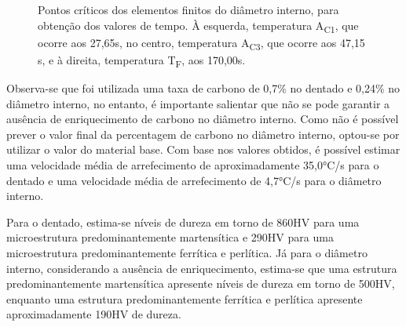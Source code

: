 \begin{figure}[htb]
\begin{subfigure}{.33\textwidth}
        \caption{}
        \label{fig:Tf_Dint}
    \end{subfigure}
    \caption[Pontos críticos dos elementos finitos do diâmetro interno]%
    {Pontos críticos dos elementos finitos do diâmetro interno, para obtenção dos valores de tempo. À esquerda, temperatura A\textsubscript{C1}, que ocorre aos 27,65s, no centro, temperatura A\textsubscript{C3}, que ocorre aos 47,15 s, e à direita, temperatura T\textsubscript{F}, aos 170,00s.}
    \label{fig:Diametro}
\end{figure}
\par
Observa-se que foi utilizada uma taxa de carbono de 0,7\% no dentado e 0,24\% no diâmetro interno, no entanto, é importante salientar que não se pode garantir a ausência de enriquecimento de carbono no diâmetro interno. Como não é possível prever o valor final da percentagem de carbono no diâmetro interno, optou-se por utilizar o valor do material base. Com base nos valores obtidos, é possível estimar uma velocidade média de arrefecimento de aproximadamente 35,0°C/s para o dentado e uma velocidade média de arrefecimento de 4,7°C/s para o diâmetro interno.
\par
Para o dentado, estima-se níveis de dureza em torno de 860HV para uma microestrutura predominantemente martensítica e 290HV para uma microestrutura predominantemente ferrítica e perlítica. Já para o diâmetro interno, considerando a ausência de enriquecimento, estima-se que uma estrutura predominantemente martensítica apresente níveis de dureza em torno de 500HV, enquanto uma estrutura predominantemente ferrítica e perlítica apresente aproximadamente 190HV de dureza.
